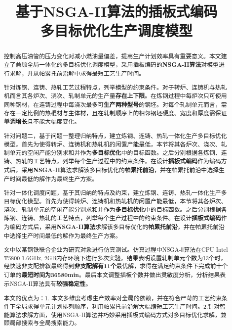 \documentclass{whutmod}
\title{基于NSGA-II算法的插板式编码\\多目标优化生产调度模型}
\begin{document}
\maketitle
\thispagestyle{empty}
\begin{abstract}

控制高压油管的压力变化对减小燃油量偏差，提高生产计划效率具有重要意义。本文建立了兼顾全局一体化的多目标优化调度模型，采用插板编码的\textbf{NSGA-II算法}对模型进行求解，并从帕累托前沿解中求得最短工艺生产时间。

\vspace{7pt}	%

针对炼钢、连铸、热轧工艺过程特点，列举模型的约束条件。对于转炉、连铸机与热轧机而言其各炉次、浇次、轧制单元的生产量\textbf{存在上下限}。在炼钢过程中每炉次只可使用同种钢材，在连铸过程中每浇次最多可\textbf{生产两种型号}的钢坯。对每个轧制单元而言，需存在一定比例的热棍材与主体材，且在轧制顺序上的相邻钢坯硬度、宽度和厚度需保证\textbf{单调增长}且不能大幅度变化。

\vspace{8pt}	%

针对问题二，基于问题一整理归纳特点，建立炼钢、连铸、热轧一体化生产多目标优化模型。首先为使得转炉、连铸机和热轧机的闲置产能最低，本节将其各炉次、浇次、轧制单元的空闲产能分别求和并作为\textbf{多目标优化}中的目标函数。之后分别根据各炼钢、连铸、热轧的工艺特点，列举每个生产过程中的约束条件。在设计\textbf{插板式编码}作为编码方式后，采用\textbf{NSGA-II}算法求解该多目标优化的\textbf{帕累托前沿}，并在帕累托前沿中选择生产时间最低的解作为最终生产方案。

针对一体化调度问题，基于其归纳的特点及约束，建立炼钢、连铸、热轧一体化生产多目标优化模型。首先为使得转炉、连铸机和热轧机的闲置产能最低，本节将其各炉次、浇次、轧制单元的空闲产能分别求和并作为\textbf{多目标优化}中的目标函数。之后分别根据各炼钢、连铸、热轧的工艺特点，列举每个生产过程中的约束条件。在设计\textbf{插板式编码}作为编码方式后，采用\textbf{NSGA-II算法}求解该多目标优化的\textbf{帕累托前沿}，并在帕累托前沿中选择生产时间最低的解作为最终生产方案。
\vspace{8pt}	%

文中以某钢铁联合企业为研究对象进行仿真测试。仿真过程中NSGA-Ⅱ算法在CPU Intel T5800 1.6GHz, 2GB内存环境下进行多次实验。结果表明设置轧制单元个数为13个时，经快速非支配排叙最终得到\textbf{非支配解有11个}最优解，求得在满足约束条件下完成前十个订单的\textbf{最短时间为36580min}。最后本文调整插板个数并做出灵敏度分析，分析结果表示NSGA-II算法具有\textbf{较强稳定性}。
\vspace{8pt}	%

本文的优点为：1. 本文多维度考虑生产效率对全局的依赖，并在符合严苛的工艺约束条件下全局求得单元计划排列顺序，利用帕累托前沿解大幅缩短工艺生产时间。2.针对智能算法求解方面，使用NSGA-II算法并巧妙采用插板式编码方式对多目标优化求解，兼顾局部搜索与全局搜索能力。

\end{abstract}
\end{document}
